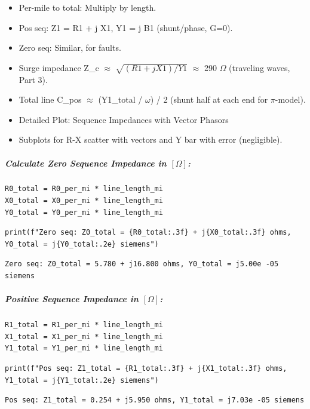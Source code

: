 \begin{itemize}
\item Per-mile to total: Multiply by length.
\item Pos seq: Z1 = R1 + j X1, Y1 = j B1 (shunt/phase, G=0).
\item Zero seq: Similar, for faults.
\item Surge impedance Z\_c $\approx$ $\sqrt{ (R1 + j X1) / Y1 }$ $\approx$ 290 $\Omega$ (traveling waves, Part 3).
\item Total line C\_pos $\approx$ (Y1\_total / $\omega$) / 2 (shunt half at each end for $\pi$-model).
\item Detailed Plot: Sequence Impedances with Vector Phasors
\item Subplots for R-X scatter with vectors and Y bar with error (negligible).
\end{itemize}

\subparagraph{Calculate Zero Sequence Impedance in $\left[\Omega\right]$:}

\begin{verbatim}
R0_total = R0_per_mi * line_length_mi
X0_total = X0_per_mi * line_length_mi
Y0_total = Y0_per_mi * line_length_mi
\end{verbatim}

\begin{verbatim}
print(f"Zero seq: Z0_total = {R0_total:.3f} + j{X0_total:.3f} ohms, Y0_total = j{Y0_total:.2e} siemens")
\end{verbatim}

\begin{verbatim}
Zero seq: Z0_total = 5.780 + j16.800 ohms, Y0_total = j5.00e -05 siemens
\end{verbatim}

\subparagraph{Positive Sequence Impedance in $\left[\Omega\right]$:}

\begin{verbatim}
R1_total = R1_per_mi * line_length_mi
X1_total = X1_per_mi * line_length_mi
Y1_total = Y1_per_mi * line_length_mi
\end{verbatim}

\begin{verbatim}
print(f"Pos seq: Z1_total = {R1_total:.3f} + j{X1_total:.3f} ohms, Y1_total = j{Y1_total:.2e} siemens")
\end{verbatim}

\begin{verbatim}
Pos seq: Z1_total = 0.254 + j5.950 ohms, Y1_total = j7.03e -05 siemens
\end{verbatim}

